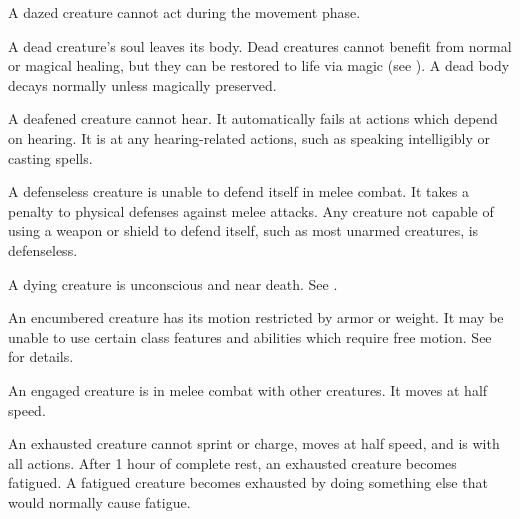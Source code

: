 
 A dazed creature cannot act during the movement phase.


 A dead creature's soul leaves its body. Dead creatures cannot benefit from normal or magical healing, but they can be restored to life via magic (see ). A dead body decays normally unless magically preserved.

 A deafened creature cannot hear. It automatically fails at actions which depend on hearing. It is \impaired at any hearing-related actions, such as speaking intelligibly or casting spells.

 A defenseless creature is unable to defend itself in melee combat. It takes a  penalty to physical defenses against melee attacks. Any creature not capable of using a weapon or shield to defend itself, such as most unarmed creatures, is defenseless.

 A dying creature is unconscious and near death. See .

 An encumbered creature has its motion restricted by armor or weight. It may be unable to use certain class features and abilities which require free motion. See  for details.

 An engaged creature is in melee combat with other creatures. It moves at half speed.


 An exhausted creature cannot sprint or charge, moves at half speed, and is \impaired with all actions. After 1 hour of complete rest, an exhausted creature becomes fatigued. A fatigued creature becomes exhausted by doing something else that would normally cause fatigue.

